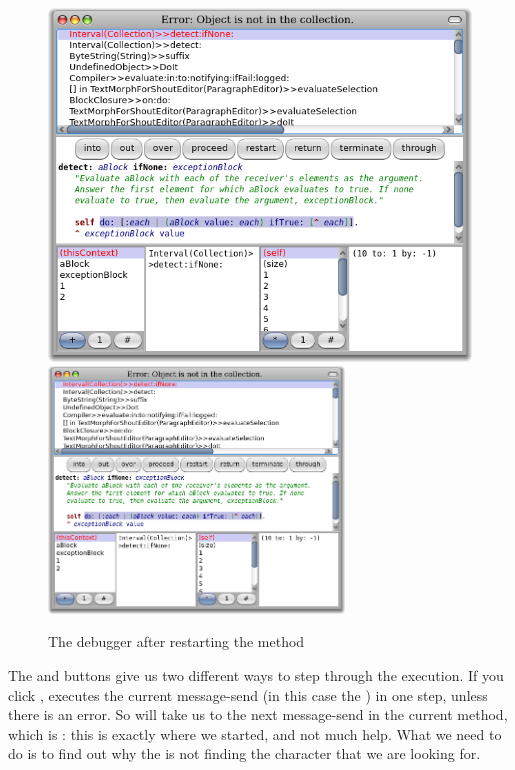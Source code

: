 \documentclass[a4paper,10pt,twoside]{book}
\begin{document}
\begin{figure}[btp]
	\begin{center}
	\ifluluelse
		{\includegraphics[width=\textwidth]{RestartDetectIfNone}}
		{\includegraphics[width=0.7\textwidth]{RestartDetectIfNone}}
	\end{center}
	\caption{The debugger after restarting the  method}
\end{figure}

The  and  buttons give us two different ways to step through the execution.  If you click , \pharo executes the current message-send (in this case the ) in one step, unless there is an error.  
So  will take us to the next message-send in the current method, which is : this is exactly where we started, and not much help. 
What we need to do is to find out why the  is not finding the character that we are looking for.
\end{document}
